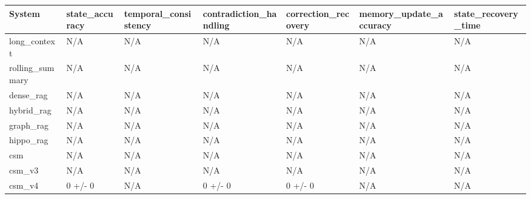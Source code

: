 \begin{tabular}{lllllll}
System & state_accuracy & temporal_consistency & contradiction_handling & correction_recovery & memory_update_accuracy & state_recovery_time \\
\hline
long\_context & N/A & N/A & N/A & N/A & N/A & N/A \\
rolling\_summary & N/A & N/A & N/A & N/A & N/A & N/A \\
dense\_rag & N/A & N/A & N/A & N/A & N/A & N/A \\
hybrid\_rag & N/A & N/A & N/A & N/A & N/A & N/A \\
graph\_rag & N/A & N/A & N/A & N/A & N/A & N/A \\
hippo\_rag & N/A & N/A & N/A & N/A & N/A & N/A \\
csm & N/A & N/A & N/A & N/A & N/A & N/A \\
csm\_v3 & N/A & N/A & N/A & N/A & N/A & N/A \\
csm\_v4 & 0 +/- 0 & N/A & 0 +/- 0 & 0 +/- 0 & N/A & N/A \\
\end{tabular}
